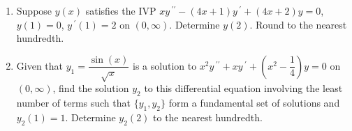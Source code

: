 \documentclass{ximera}
\begin{document}
\begin{enumerate}[label=(\arabic*)]
\begin{enumerate}[label=(\alph*)]
\item $z\,^{\prime}+\dfrac{1}{x}z=0$
\item $z\,^{\prime}-\dfrac{1}{x}z=0$  %
\item $z\,^{\prime}+\left(4+\dfrac{1}{x}\right)z=0$
\item $z\,^{\prime}-\left(4+\dfrac{1}{x}\right)z=0$
\item $z\,^{\prime}+\left(4-\dfrac{1}{x}\right)z=0$
\item $z\,^{\prime}-\left(4-\dfrac{1}{x}\right)z=0$
\end{enumerate}


\newpage

\item Suppose $y(x)$ satisfies the IVP $xy\,^{\prime\prime}-(4x+1)y\,^{\prime}+(4x+2)y=0$, $y(1)=0$, $y\,^{\prime}(1)=2$ on $(0,\infty)$.  Determine $y(2)$.  Round to the nearest hundredth.






\item Given that $y_1=\dfrac{\sin{(x)}}{\sqrt{x}}$ is a solution to $x^2y\,^{\prime\prime}+xy\,^{\prime}+\left(x^2-\dfrac{1}{4}\right)y=0$ on $(0,\infty)$, find the solution $y_2$ to this differential equation involving the least number of terms such that $\{y_1,y_2\}$ form a fundamental set of solutions and $y_2(1)=1$.  Determine $y_2(2)$ to the nearest hundredth.











\end{enumerate}
\end{document}
